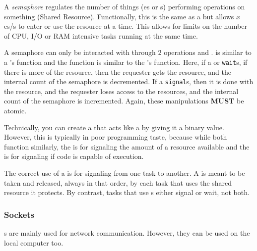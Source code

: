 \begin{definition}[Semaphore]\label{def:Semaphore}
  A \emph{semaphore} regulates the number of things (es or s) performing operations on something (Shared Resource).
  Functionally, this is the same as a  but allows $x$ es/s to enter or use the resource at a time.
  This allows for limits on the number of CPU, I/O or RAM intensive tasks running at the same time.

  A semaphore can only be interacted with through 2 operations  and .
   is similar to a 's  function and the  function is similar to the 's  function.
  Here, if a  or  \texttt{wait}s, if there is more of the resource, then the requester gets the resource, and the internal count of the semaphore is decremented.
  If a  \texttt{signal}s, then it is done with the resource, and the requester loses access to the resources, and the internal count of the semaphore is incremented.
  Again, these manipulations \textbf{MUST} be atomic.

  \begin{remark}\label{rmk:Semaphore_Mutex_Confusion}
    Technically, you can create a  that acts like a  by giving it a binary value.
    However, this is typically in poor programming taste, because while both function similarly, the  is for signaling the amount of a resource available and the  is for signaling if code is capable of execution.
  \end{remark}

  \begin{remark}\label{rmk:Semaphore_Correct_Usage}
    The correct use of a  is for signaling from one task to another.
    A  is meant to be taken and released, always in that order, by each task that uses the shared resource it protects.
    By contrast, tasks that use s either signal or wait, not both.
  \end{remark}
\end{definition}

\subsubsection{Sockets}\label{subsubsec:Sockets}
s are mainly used for network communication.
However, they can be used on the local computer too.

